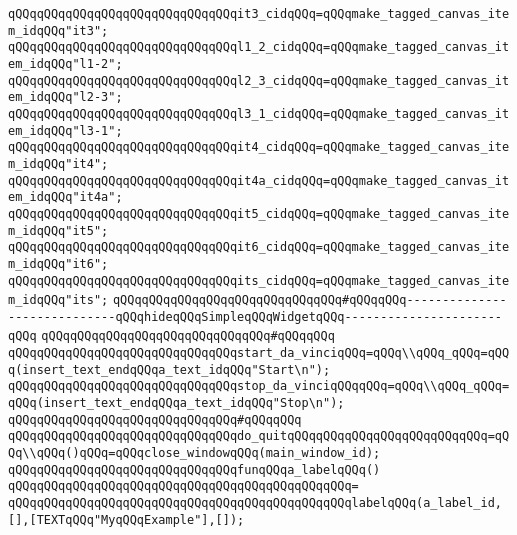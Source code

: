 \verb|qQQqqQQqqQQqqQQqqQQqqQQqqQQqqQQqit3_cidqQQq=qQQqmake_tagged_canvas_item_idqQQq"it3";|\newline
\verb|qQQqqQQqqQQqqQQqqQQqqQQqqQQqqQQql1_2_cidqQQq=qQQqmake_tagged_canvas_item_idqQQq"l1-2";|\newline
\verb|qQQqqQQqqQQqqQQqqQQqqQQqqQQqqQQql2_3_cidqQQq=qQQqmake_tagged_canvas_item_idqQQq"l2-3";|\newline
\verb|qQQqqQQqqQQqqQQqqQQqqQQqqQQqqQQql3_1_cidqQQq=qQQqmake_tagged_canvas_item_idqQQq"l3-1";|\newline
\verb|qQQqqQQqqQQqqQQqqQQqqQQqqQQqqQQqit4_cidqQQq=qQQqmake_tagged_canvas_item_idqQQq"it4";|\newline
\verb|qQQqqQQqqQQqqQQqqQQqqQQqqQQqqQQqit4a_cidqQQq=qQQqmake_tagged_canvas_item_idqQQq"it4a";|\newline
\verb|qQQqqQQqqQQqqQQqqQQqqQQqqQQqqQQqit5_cidqQQq=qQQqmake_tagged_canvas_item_idqQQq"it5";|\newline
\verb|qQQqqQQqqQQqqQQqqQQqqQQqqQQqqQQqit6_cidqQQq=qQQqmake_tagged_canvas_item_idqQQq"it6";|\newline
\verb|qQQqqQQqqQQqqQQqqQQqqQQqqQQqqQQqits_cidqQQq=qQQqmake_tagged_canvas_item_idqQQq"its";|\newline
\newline
\verb|qQQqqQQqqQQqqQQqqQQqqQQqqQQqqQQq#qQQqqQQq-----------------------------qQQqhideqQQqSimpleqQQqWidgetqQQq----------------------qQQq|\newline
\verb|qQQqqQQqqQQqqQQqqQQqqQQqqQQqqQQq#qQQqqQQq|\newline
\verb|qQQqqQQqqQQqqQQqqQQqqQQqqQQqqQQqstart_da_vinciqQQq=qQQq\\qQQq_qQQq=qQQq(insert_text_endqQQqa_text_idqQQq"Start\n");|\newline
\verb|qQQqqQQqqQQqqQQqqQQqqQQqqQQqqQQqstop_da_vinciqQQqqQQq=qQQq\\qQQq_qQQq=qQQq(insert_text_endqQQqa_text_idqQQq"Stop\n");|\newline
\verb|qQQqqQQqqQQqqQQqqQQqqQQqqQQqqQQq#qQQqqQQq|\newline
\verb|qQQqqQQqqQQqqQQqqQQqqQQqqQQqqQQqdo_quitqQQqqQQqqQQqqQQqqQQqqQQqqQQq=qQQq\\qQQq()qQQq=qQQqclose_windowqQQq(main_window_id);|\newline
\newline
\verb|qQQqqQQqqQQqqQQqqQQqqQQqqQQqqQQqfunqQQqa_labelqQQq()|\newline
\verb|qQQqqQQqqQQqqQQqqQQqqQQqqQQqqQQqqQQqqQQqqQQqqQQq=|\newline
\verb|qQQqqQQqqQQqqQQqqQQqqQQqqQQqqQQqqQQqqQQqqQQqqQQqlabelqQQq(a_label_id,[],[TEXTqQQq"MyqQQqExample"],[]);|\newline
